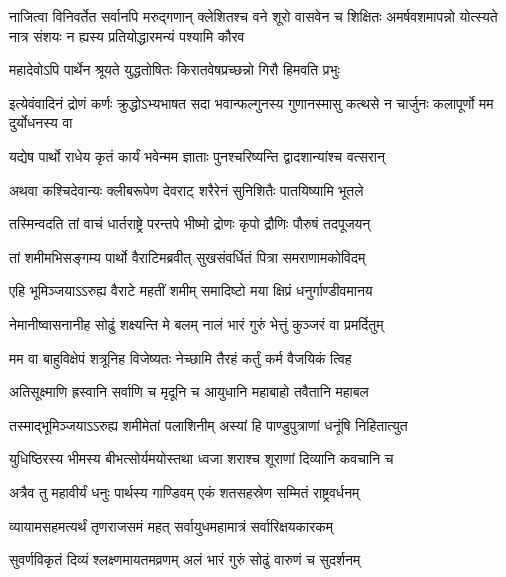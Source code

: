 \onelineshloka
{नाजित्वा विनिवर्तेत सर्वानपि मरुद्गणान्}
\threelineshloka
{क्लेशितश्च वने शूरो वासवेन च शिक्षितः}
{अमर्षवशमापन्नो योत्स्यते नात्र संशयः}
{न ह्यस्य प्रतियोद्धारमन्यं पश्यामि कौरव}


\twolineshloka
{महादेवोऽपि पार्थेन श्रूयते युद्धतोषितः}
{किरातवेषप्रच्छन्नो गिरौ हिमवति प्रभुः}


\onelineshloka
{इत्येवंवादिनं द्रोणं कर्णः क्रुद्धोऽभ्यभाषत}
\twolineshloka
{सदा भवान्फल्गुनस्य गुणानस्मासु कत्थसे}
{न चार्जुनः कलापूर्णो मम दुर्योधनस्य वा}




\twolineshloka
{यद्येष पार्थो राधेय कृतं कार्यं भवेन्मम}
{ज्ञाताः पुनश्चरिष्यन्ति द्वादशान्यांश्च वत्सरान्}


\twolineshloka
{अथवा कश्चिदेवान्यः क्लीबरूपेण देवराट्}
{शरैरेनं सुनिशितैः पातयिष्यामि भूतले}



\twolineshloka
{तस्मिन्वदति तां वाचं धार्तराष्ट्रे परन्तपे}
{भीष्मो द्रोणः कृपो द्रौणिः पौरुषं तदपूजयन्}


\twolineshloka
{तां शमीमभिसङ्गम्य पार्थो वैराटिमब्रवीत्}
{सुखसंवर्धितं पित्रा समराणामकोविदम्}


\twolineshloka
{एहि भूमिञ्जयाऽऽरुह्य वैराटे महतीं शमीम्}
{समादिष्टो मया क्षिप्रं धनुर्गाण्डीवमानय}


\twolineshloka
{नेमानीष्वासनानीह सोढुं शक्ष्यन्ति मे बलम्}
{नालं भारं गुरुं भेत्तुं कुञ्जरं वा प्रमर्दितुम्}


\twolineshloka
{मम वा बाहुविक्षेपं शत्रूनिह विजेष्यतः}
{नेच्छामि तैरहं कर्तुं कर्म वैजयिकं त्विह}


\twolineshloka
{अतिसूक्ष्माणि ह्रस्वानि सर्वाणि च मृदूनि च}
{आयुधानि महाबाहो तवैतानि महाबल}


\twolineshloka
{तस्माद्भूमिञ्जयाऽऽरुह्य शमीमेतां पलाशिनीम्}
{अस्यां हि पाण्डुपुत्राणां धनूंषि निहितात्युत}


\twolineshloka
{युधिष्ठिरस्य भीमस्य बीभत्सोर्यमयोस्तथा}
{ध्वजा शराश्च शूराणां दिव्यानि कवचानि च}


\twolineshloka
{अत्रैव तु महावीर्यं धनुः पार्थस्य गाण्डिवम्}
{एकं शतसहस्रेण सम्मितं राष्ट्रवर्धनम्}


\twolineshloka
{व्यायामसहमत्यर्थं तृणराजसमं महत्}
{सर्वायुधमहामात्रं सर्वारिक्षयकारकम्}


\twolineshloka
{सुवर्णविकृतं दिव्यं श्लक्ष्णमायतमव्रणम्}
{अलं भारं गुरुं सोढुं वारुणं च सुदर्शनम्}



